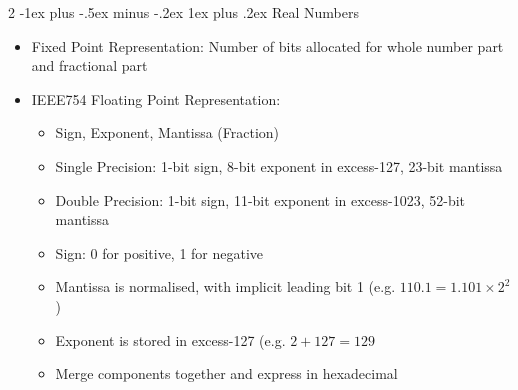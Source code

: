 \documentclass[10pt, portrait]{article}
\makeatletter
\renewcommand{\subsection}{\@startsection{subsection}{3}{0mm}%
                                {-1ex plus -.5ex minus -.2ex}%
                                {1ex plus .2ex}%
                                {\normalfont\small\bfseries}}%
\makeatother
\begin{document}
\begin{multicols*}{2}
\subsection{Real Numbers}
\begin{itemize}
    \item Fixed Point Representation: Number of bits allocated for whole number part and fractional part
    \item IEEE754 Floating Point Representation:
    \begin{itemize}
        \item Sign, Exponent, Mantissa (Fraction)
        \item Single Precision: 1-bit sign, 8-bit exponent in excess-127, 23-bit mantissa
        \item Double Precision: 1-bit sign, 11-bit exponent in excess-1023, 52-bit mantissa
        \item Sign: 0 for positive, 1 for negative
        \item Mantissa is normalised, with implicit leading bit 1 (e.g. $110.1 = 1.101 \times 2^2$)
        \item Exponent is stored in excess-127 (e.g. $2+127=129$
        \item Merge components together and express in hexadecimal
    \end{itemize}
\end{itemize}
\begin{center}
    \begingroup
    \renewcommand{\arraystretch}{1.3} 
\end{center}
\end{multicols*}
\end{document}

